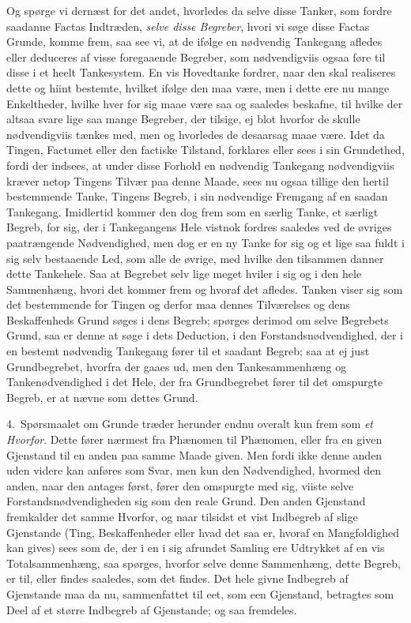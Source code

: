 \documentclass[12pt,a4paper]{book}
\newcommand{\apage}[1]{\marginnote{\footnotesize\textit{[#1]}}}
\begin{document}
Og spørge vi dernæst for det andet, hvorledes da selve disse Tanker, som fordre
saadanne Factas Indtræden, \emph{selve disse Begreber}, hvori vi søge disse Factas
Grunde, komme frem, saa see vi, at de ifølge en nødvendig Tankegang afledes eller
deduceres af visse foregaaende Begreber, som nødvendigviis ogsaa føre til disse i
et heelt Tankesystem. En vis Hovedtanke fordrer, naar den skal realiseres dette og
hiint bestemte, hvilket ifølge den maa være, men i dette ere nu mange
Enkeltheder, hvilke hver for sig maae være saa og saaledes beskafne, til hvilke
der altsaa svare lige saa mange Begreber, der tilsige, ej blot hvorfor de skulle
nødvendigviis tænkes med, men og hvorledes de desaarsag maae være. Idet da Tingen,
Factumet eller den factiske Tilstand, forklares eller sees i sin Grundethed, fordi
der indsees, at under disse Forhold en nødvendig Tankegang nødvendigviis kræver
netop Tingens Tilvær paa denne \apage{100} Maade, sees nu ogsaa tillige den hertil bestemmende
Tanke, Tingens Begreb, i sin nødvendige Fremgang af en saadan Tankegang.
Imidlertid kommer den dog frem som en særlig Tanke, et særligt Begreb, for sig,
der i Tankegangens Hele vistnok fordres saaledes ved de øvriges paatrængende
Nødvendighed, men dog er en ny Tanke for sig og et lige saa fuldt i sig selv
bestaaende Led, som alle de øvrige, med hvilke den tilsammen danner dette
Tankehele. Saa at Begrebet selv lige meget hviler i sig og i den hele Sammenhæng,
hvori det kommer frem og hvoraf det afledes. Tanken viser sig som det bestemmende
for Tingen og derfor maa dennes Tilværelses og dens Beskaffenheds Grund søges i
dens Begreb; spørges derimod om selve Begrebets Grund, saa er denne at søge i dets
Deduction, i den Forstandsnødvendighed, der i en bestemt nødvendig Tankegang fører
til et saadant Begreb; saa at ej just Grundbegrebet, hvorfra der gaaes ud, men den
Tankesammenhæng og Tankenødvendighed i det Hele, der fra Grundbegrebet fører til
det omspurgte Begreb, er at nævne som dettes Grund.

4.~Spørsmaalet om Grunde træder herunder endnu overalt kun frem som \emph{et
Hvorfor}. Dette fører nærmest fra Phænomen til Phænomen, eller fra en given
Gjenstand til en anden paa samme Maade given. Men fordi ikke denne anden uden
videre kan anføres som Svar, men kun \apage{101} den Nødvendighed, hvormed den anden, naar den antages først, fører den omspurgte med sig, viiste selve Forstandsnødvendigheden sig som den reale Grund. Den anden Gjenstand fremkalder det samme Hvorfor, og naar tilsidst et vist Indbegreb af slige Gjenstande (Ting, Beskaffenheder eller hvad det saa er, hvoraf en Mangfoldighed kan gives) sees som de, der i en i sig afrundet Samling ere Udtrykket af en vis Totalsammenhæng, saa spørges, hvorfor selve denne Sammenhæng, dette Begreb, er til, eller findes saaledes, som det findes. Det hele givne Indbegreb af Gjenstande maa da nu, sammenfattet til eet, som een Gjenstand, betragtes som Deel af et større Indbegreb af Gjenstande; og saa fremdeles.
\end{document}
